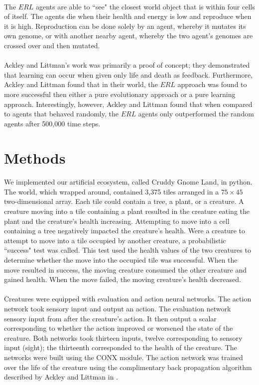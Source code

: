 \documentclass[12pt]{report}
\begin{document}
\paragraph{} The $ERL$ agents are able to ``see" the closest world object that is within four cells of itself. The agents die when their health and energy is low and reproduce when it is high. Reproduction can be done solely by an agent, whereby it mutates its own genome, or with another nearby agent, whereby the two agent's genomes are crossed over and then mutated.
\paragraph{} Ackley and Littman's work was primarily a proof of concept; they demonstrated that learning can occur when given only life and death as feedback. Furthermore, Ackley and Littman found that in their world, the $ERL$ approach was found to more successful then either a pure evolutionary approach or a pure learning approach. Interestingly, however, Ackley and Littman  found that when compared to agents that behaved randomly, the $ERL$ agents only outperformed the random agents after 500,000 time steps. 

\section*{Methods}
\paragraph{} We implemented our artificial ecosystem, called Cruddy Gnome Land, in python. The world, which wrapped around, contained 3,375 tiles arranged in a $75 \times 45$ two-dimensional array. Each tile could contain a tree, a plant, or a creature. A creature moving into a tile containing a plant resulted in the creature eating the plant and the creature's health increasing. Attempting to move into a cell containing a tree negatively impacted the creature's health. Were a creature to attempt to move into a tile occupied by another creature, a probabilistic ``success" test was called. This test used the health values of the two creatures to determine whether the move into the occupied tile was successful. When the move resulted in success, the moving creature consumed the other creature and gained health. When the move failed, the moving creature's health decreased.
\paragraph{}  Creatures were equipped with evaluation and action neural networks. The action network took sensory input and output an action. The evaluation network sensory input from after the creature's action. It then output a scalar corresponding to whether the action improved or worsened the state of the creature. Both networks took thirteen inputs, twelve corresponding to sensory input (sight); the thirteenth corresponded to the health of the creature. The networks were built using the CONX module. The action network was trained over the life of the creature using the complimentary back propagation algorithm described by Ackley and Littman in \cite{erl}. 
\end{document}
